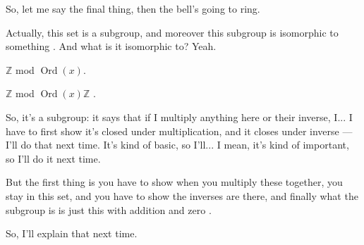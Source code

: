 \begin{hidden}
\end{hidden}

\begin{speech}[01:27:11 - 01:27:30]
So, let me say the final thing, then the bell's going to ring.

Actually, this set is a subgroup, and moreover this subgroup is isomorphic to something . And what is it isomorphic to? Yeah.
\end{speech}

\begin{student}
$\mathbb{Z}$ mod $\operatorname{Ord}(x)$.
\end{student}

\begin{speech}[01:27:32 - 01:28:18]
$\mathbb{Z}$ mod $\operatorname{Ord}(x)\mathbb{Z}$ .

So, it's a subgroup: it says that if I multiply anything here or their inverse, I... I have to first show it's closed under multiplication, and it closes under inverse --- I'll do that next time. It's kind of basic, so I'll... I mean, it's kind of important, so I'll do it next time.

But the first thing is you have to show when you multiply these together, you stay in this set, and you have to show the inverses are there, and finally what the subgroup is is just this with addition and zero .

So, I'll explain that next time.
\end{speech}

